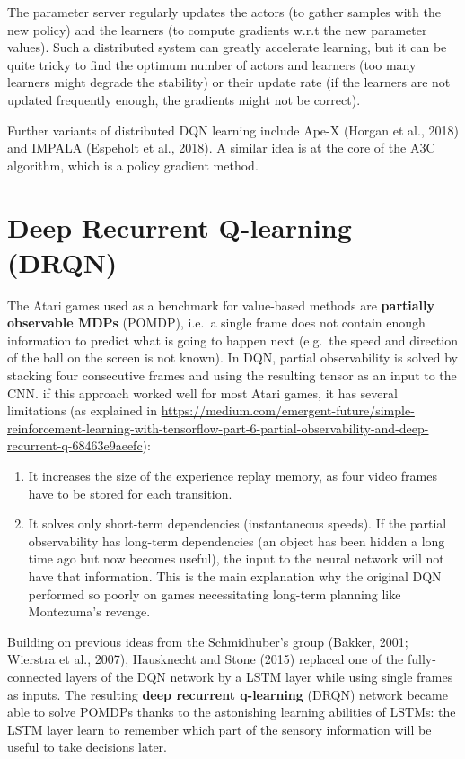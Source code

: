 \documentclass[
  letterpaper,
  DIV=11,
  numbers=noendperiod]{scrreprt}
\providecommand{\tightlist}{%
  \setlength{\itemsep}{0pt}\setlength{\parskip}{0pt}}\usepackage{longtable,booktabs,array}
\begin{document}
The parameter server regularly updates the actors (to gather samples
with the new policy) and the learners (to compute gradients w.r.t the
new parameter values). Such a distributed system can greatly accelerate
learning, but it can be quite tricky to find the optimum number of
actors and learners (too many learners might degrade the stability) or
their update rate (if the learners are not updated frequently enough,
the gradients might not be correct).

Further variants of distributed DQN learning include Ape-X (Horgan et
al., 2018) and IMPALA (Espeholt et al., 2018). A similar idea is at the
core of the A3C algorithm, which is a policy gradient method.

\hypertarget{deep-recurrent-q-learning-drqn}{%
\section{Deep Recurrent Q-learning
(DRQN)}\label{deep-recurrent-q-learning-drqn}}

The Atari games used as a benchmark for value-based methods are
\textbf{partially observable MDPs} (POMDP), i.e.~a single frame does not
contain enough information to predict what is going to happen next
(e.g.~the speed and direction of the ball on the screen is not known).
In DQN, partial observability is solved by stacking four consecutive
frames and using the resulting tensor as an input to the CNN. if this
approach worked well for most Atari games, it has several limitations
(as explained in
\url{https://medium.com/emergent-future/simple-reinforcement-learning-with-tensorflow-part-6-partial-observability-and-deep-recurrent-q-68463e9aeefc}):

\begin{enumerate}
\def\labelenumi{\arabic{enumi}.}
\tightlist
\item
  It increases the size of the experience replay memory, as four video
  frames have to be stored for each transition.
\item
  It solves only short-term dependencies (instantaneous speeds). If the
  partial observability has long-term dependencies (an object has been
  hidden a long time ago but now becomes useful), the input to the
  neural network will not have that information. This is the main
  explanation why the original DQN performed so poorly on games
  necessitating long-term planning like Montezuma's revenge.
\end{enumerate}

Building on previous ideas from the Schmidhuber's group (Bakker, 2001;
Wierstra et al., 2007), Hausknecht and Stone (2015) replaced one of the
fully-connected layers of the DQN network by a LSTM layer while using
single frames as inputs. The resulting \textbf{deep recurrent
q-learning} (DRQN) network became able to solve POMDPs thanks to the
astonishing learning abilities of LSTMs: the LSTM layer learn to
remember which part of the sensory information will be useful to take
decisions later.
\end{document}
